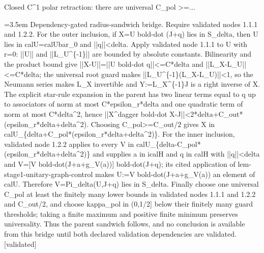 \documentclass{article}
\newcommand{\step}[1]{\par\noindent\hangindent=3.5em\hangafter=1%
  \makebox[3.5em][l]{\textbf{#1.}}}
\newcommand{\steptag}[1]{\hfill{\small\textsf{[#1]}}}
\begin{document}
\begin{proofbox}{Closed C\textasciicircum{}1 polar retraction: there are universal C\_pol >=...}
\step{1.4.1.1} Dependency-gated radius-sandwich bridge. Require validated nodes 1.1.1 and 1.2.2. For the outer inclusion, if X=U bold-dot (J+q) lies in S\_delta, then U lies in calU=calUbar\_0 and ||q||<delta. Apply validated node 1.1.1 to U with r=0: ||U|| and ||L\_U\textasciicircum{}\{-1\}|| are bounded by absolute constants. Bilinearity and the product bound give ||X-U||=||U bold-dot q||<=C*delta and ||L\_X-L\_U||<=C*delta; the universal root guard makes ||L\_U\textasciicircum{}\{-1\}(L\_X-L\_U)||<1, so the Neumann series makes L\_X invertible and Y:=L\_X\textasciicircum{}\{-1\}J is a right inverse of X. The explicit star-rule expansion in the parent has two linear terms equal to q up to associators of norm at most C*epsilon\_r*delta and one quadratic term of norm at most C*delta\textasciicircum{}2, hence ||X\textasciicircum{}dagger bold-dot X-J||<2*delta+C\_out*(epsilon\_r*delta+delta\textasciicircum{}2). Choosing C\_pol>=C\_out/2 gives X in calU\_\{delta+C\_pol*(epsilon\_r*delta+delta\textasciicircum{}2)\}. For the inner inclusion, validated node 1.2.2 applies to every V in calU\_\{delta-C\_pol*(epsilon\_r*delta+delta\textasciicircum{}2)\} and supplies a in icalH and q in calH with ||q||<delta and V=[V bold-dot(J+a+g\_V(a))] bold-dot(J+q); its cited application of lem-stage1-unitary-graph-control makes U:=V bold-dot(J+a+g\_V(a)) an element of calU. Therefore V=Pi\_delta(U,J+q) lies in S\_delta. Finally choose one universal C\_pol at least the finitely many lower bounds in validated nodes 1.1.1 and 1.2.2 and C\_out/2, and choose kappa\_pol in (0,1/2] below their finitely many guard thresholds; taking a finite maximum and positive finite minimum preserves universality. Thus the parent sandwich follows, and no conclusion is available from this bridge until both declared validation dependencies are validated. \steptag{validated} \\[4pt]
\end{proofbox}
\end{document}
